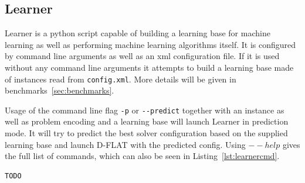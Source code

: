 \subsection{Learner}
Learner is a python script capable of building a learning base for machine learning as well as performing machine learning algorithms itself. It is configured by command line arguments as well as an xml configuration file. If it is used without any command line arguments it attempts to build a learning base made of instances read from \lstinline$config.xml$. More details will be given in benchmarks~\ref{sec:benchmarks}.

Usage of the command line flag \lstinline$-p$ or \lstinline$--predict$ together with an instance as well as problem encoding and a learning base will launch Learner in prediction mode. It will try to predict the best solver configuration based on the supplied learning base and launch D-FLAT with the predicted config. Using $--help$ gives the full list of commands, which can also be seen in Listing~\ref{lst:learnercmd}.
\begin{lstlisting}[label=lst:learnercmd]
TODO
\end{lstlisting}


